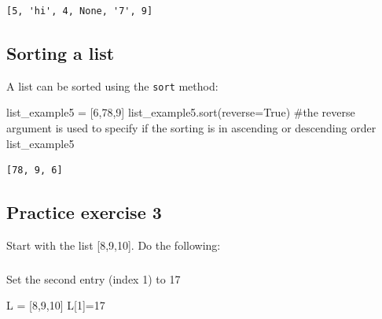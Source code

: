 \documentclass[
  letterpaper,
  DIV=11,
  numbers=noendperiod]{scrreprt}
\newenvironment{Shaded}{\begin{snugshade}}{\end{snugshade}}
\newcommand{\CommentTok}[1]{\textcolor[rgb]{0.37,0.37,0.37}{#1}}
\newcommand{\DecValTok}[1]{\textcolor[rgb]{0.68,0.00,0.00}{#1}}
\newcommand{\NormalTok}[1]{\textcolor[rgb]{0.00,0.23,0.31}{#1}}
\newcommand{\OperatorTok}[1]{\textcolor[rgb]{0.37,0.37,0.37}{#1}}
\newcommand{\VariableTok}[1]{\textcolor[rgb]{0.07,0.07,0.07}{#1}}
\begin{document}
\begin{verbatim}
[5, 'hi', 4, None, '7', 9]
\end{verbatim}

\hypertarget{sorting-a-list}{%
\subsection{Sorting a list}\label{sorting-a-list}}

A list can be sorted using the \texttt{sort} method:

\begin{Shaded}
\begin{Highlighting}[]
\NormalTok{list\_example5 }\OperatorTok{=}\NormalTok{ [}\DecValTok{6}\NormalTok{,}\DecValTok{78}\NormalTok{,}\DecValTok{9}\NormalTok{]}
\NormalTok{list\_example5.sort(reverse}\OperatorTok{=}\VariableTok{True}\NormalTok{) }\CommentTok{\#the reverse argument is used to specify if the sorting is in ascending or descending order}
\NormalTok{list\_example5}
\end{Highlighting}
\end{Shaded}

\begin{verbatim}
[78, 9, 6]
\end{verbatim}

\hypertarget{practice-exercise-3}{%
\subsection{Practice exercise 3}\label{practice-exercise-3}}

Start with the list {[}8,9,10{]}. Do the following:

\hypertarget{section-4}{%
\subsubsection{}\label{section-4}}

Set the second entry (index 1) to 17

\begin{Shaded}
\begin{Highlighting}[]
\NormalTok{L }\OperatorTok{=}\NormalTok{ [}\DecValTok{8}\NormalTok{,}\DecValTok{9}\NormalTok{,}\DecValTok{10}\NormalTok{]}
\NormalTok{L[}\DecValTok{1}\NormalTok{]}\OperatorTok{=}\DecValTok{17}
\end{Highlighting}
\end{Shaded}

\hypertarget{section-5}{%
\subsubsection{}\label{section-5}}
\end{document}
